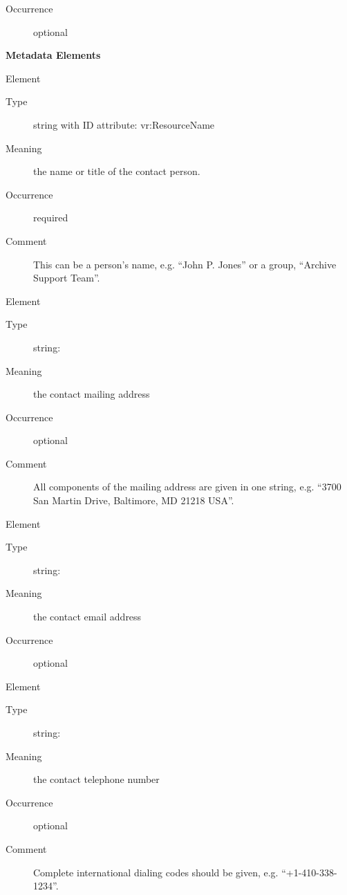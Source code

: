 \documentclass[11pt,a4paper]{ivoa}
\begin{document}
\begin{generated}
\begin{bigdescription}
\begin{description}
\item[Occurrence] optional

\end{description}


\end{bigdescription}\endgroup



\vspace{0.5ex}\noindent\textbf{ Metadata Elements}

\begingroup\small\begin{bigdescription}\item[Element \xmlel{name}]
\begin{description}
\item[Type] string with ID attribute: vr:ResourceName
\item[Meaning]
                  the name or title of the contact person.

\item[Occurrence] required
\item[Comment]
                  This can be a person's name, e.g. “John P. Jones” or
                  a group, “Archive Support Team”.


\end{description}
\item[Element \xmlel{address}]
\begin{description}
\item[Type] string: 
\item[Meaning] the contact mailing address
\item[Occurrence] optional
\item[Comment]
                All components of the mailing address are given in one
                string, e.g. “3700 San Martin Drive, Baltimore, MD 21218 USA”.


\end{description}
\item[Element \xmlel{email}]
\begin{description}
\item[Type] string: 
\item[Meaning] the contact email address
\item[Occurrence] optional

\end{description}
\item[Element \xmlel{telephone}]
\begin{description}
\item[Type] string: 
\item[Meaning] the contact telephone number
\item[Occurrence] optional
\item[Comment]
                Complete international dialing codes should be given, e.g.
                “+1-410-338-1234”.



\end{description}
\end{bigdescription}
\end{generated}
\end{document}

